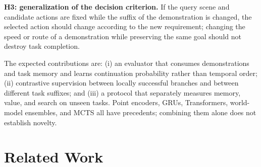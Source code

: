 \documentclass[
  10pt,
]{article}
\begin{document}
\textbf{H3: generalization of the decision criterion.} If the query scene and candidate actions are fixed while the suffix of the demonstration is changed, the selected action should change according to the new requirement; changing the speed or route of a demonstration while preserving the same goal should not destroy task completion.

The expected contributions are: (i) an evaluator that consumes demonstrations and task memory and learns continuation probability rather than temporal order; (ii) contrastive supervision between locally successful branches and between different task suffixes; and (iii) a protocol that separately measures memory, value, and search on unseen tasks. Point encoders, GRUs, Transformers, world-model ensembles, and MCTS all have precedents; combining them alone does not establish novelty.

\hypertarget{cuxf4ng-truxecnh-liuxean-quan}{%
\section{Related Work}\label{cuxf4ng-truxecnh-liuxean-quan}}
\end{document}
